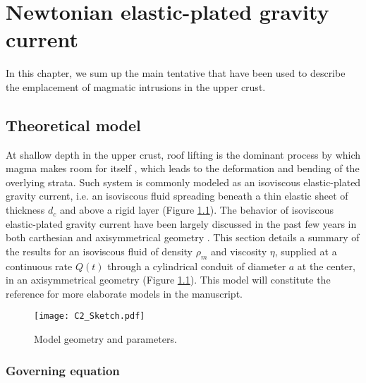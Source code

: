 \chapter{Newtonian elastic-plated gravity current} 
\label{chap2} 
\minitoc

In this chapter, we  sum up the main tentative that  have been used to
describe the emplacement of magmatic intrusions in the upper crust.

\section{Theoretical model}
\label{C2-sec:model}

At shallow  depth in  the upper  crust, roof  lifting is  the dominant
process     by    which     magma     makes     room    for     itself
\citep{Johnson:1973ho,Pollard:1973ho}, which leads  to the deformation
and bending of the overlying  strata.  Such system is commonly modeled
as an  isoviscous elastic-plated gravity current,  i.e.  an isoviscous
fluid spreading  beneath a thin  elastic sheet of thickness  $d_c$ and
above  a  rigid   layer  \citep{Michaut:2011kg,Bunger:2011cb}  (Figure
\ref{C2-Sketch}).  The  behavior of isoviscous  elastic-plated gravity
current have  been largely  discussed in  the past  few years  in both
carthesian \citep{Michaut:2011kg,Bunger:2011cb,Anonymous:QWXp_4JV} and
axisymmetrical  geometry  \citep{Michaut:2013dr,Lister:2013ia}.   This
section details  a summary of the  results for an isoviscous  fluid of
density $\rho_m$ and  viscosity $\eta$, supplied at  a continuous rate
$Q(t)$ through a cylindrical conduit of  diameter $a$ at the center, in
an axisymmetrical  geometry (Figure \ref{C2-Sketch}). This  model will
constitute the reference for more elaborate models in the manuscript.

\begin{figure}[htbp]
  \begin{center}
    \graphicspath{ {/Users/thorey/Documents/These/Manuscript/Figure/Chapter2/} }
    \texttt{[image: C2\_Sketch.pdf]}
    \caption{Model geometry and parameters.}
    \label{C2-Sketch}
  \end{center}
\end{figure}

\subsection{Governing equation}
\label{C2-sec:Governing equation}

